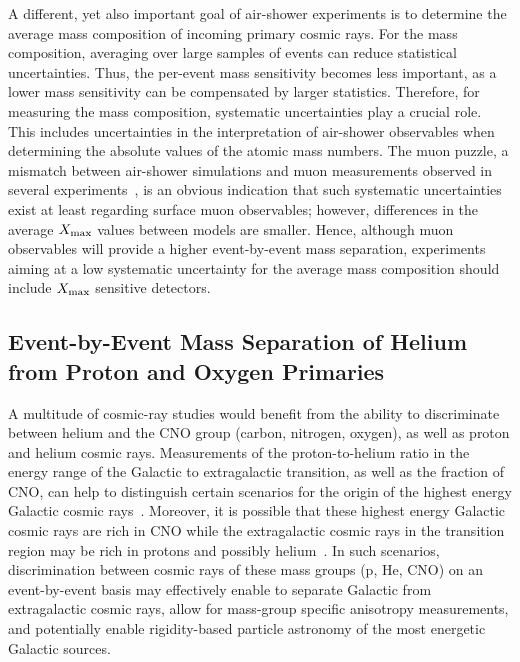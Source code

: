 A different, yet also important goal of air-shower experiments is to determine the average mass composition of incoming primary cosmic rays.
For the mass composition, averaging over large samples of events can reduce statistical uncertainties.
Thus, the per-event mass sensitivity becomes less important, as a lower mass sensitivity can be compensated by larger statistics.
Therefore, for measuring the mass composition, systematic uncertainties play a crucial role.
This includes uncertainties in the interpretation of air-shower observables when determining the absolute values of the atomic mass numbers.
The muon puzzle, a mismatch between air-shower simulations and muon measurements observed in several experiments~\cite{whisp_2019, icrc2021_soldin_whisp}, is an obvious indication that such systematic uncertainties exist at least regarding surface muon observables; however, differences in the average $X_{\rm max}$ values between models are smaller.
Hence, although muon observables will provide a higher event-by-event mass separation, experiments aiming at a low systematic uncertainty for the average mass composition should include $X_{\rm max}$ sensitive detectors.




\subsection{Event-by-Event Mass Separation of Helium from Proton and Oxygen Primaries}\label{ssec:intermediate}
A multitude of cosmic-ray studies would benefit from the ability to discriminate between helium and the CNO group (carbon, nitrogen, oxygen), as well as proton and helium cosmic rays.
Measurements of the proton-to-helium ratio in the energy range of the Galactic to extragalactic transition, as well as the fraction of CNO, can help to distinguish certain scenarios for the origin of the highest energy Galactic cosmic rays~\cite{thoudam_aa2016_spectrum}.
Moreover, it is possible that these highest energy Galactic cosmic rays are rich in CNO while the extragalactic cosmic rays in the transition region may be rich in protons and possibly helium~\cite{auger_jcap2023_sources, auger_prd2026_xmax}.
In such scenarios, discrimination between cosmic rays of these mass groups (p, He, CNO) on an event-by-event basis may effectively enable to separate Galactic from extragalactic cosmic rays, allow for mass-group specific anisotropy measurements, and potentially enable rigidity-based particle astronomy of the most energetic Galactic sources.

